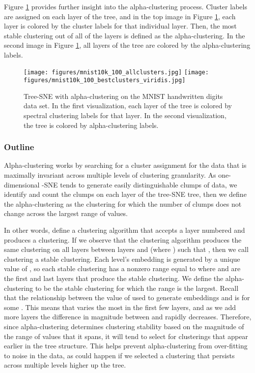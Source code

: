 \documentclass{article}
\begin{document}
Figure \ref{fig:MNIST-alpha-clustering-all-best} provides further insight into the alpha-clustering process. Cluster labels are assigned on each layer of the tree, and in the top image in Figure \ref{fig:MNIST-alpha-clustering-all-best}, each layer is colored by the cluster labels for that individual layer. Then, the most stable clustering out of all of the layers is defined as the alpha-clustering. In the second image in Figure \ref{fig:MNIST-alpha-clustering-all-best}, all layers of the tree are colored by the alpha-clustering labels.  

\begin{figure}[htp]
    \centering
    \captionsetup{width=.9\linewidth}
    \texttt{[image: figures/mnist10k\_100\_allclusters.jpg]}
    \texttt{[image: figures/mnist10k\_100\_bestclusters\_viridis.jpg]}
    \caption{Tree-SNE with alpha-clustering on the MNIST handwritten digits data set. In the first visualization, each layer of the tree is colored by spectral clustering labels for that layer. In the second visualization, the tree is colored by alpha-clustering labels.}
    \label{fig:MNIST-alpha-clustering-all-best}
\end{figure}

\subsubsection{Outline}

Alpha-clustering works by searching for a cluster assignment for the data that is maximally invariant across multiple levels of clustering granularity. As one-dimensional -SNE tends to generate easily distinguishable clumps of data, we identify and count the clumps on each layer of the tree-SNE tree, then we define the alpha-clustering as the clustering for which the number of clumps does not change across the largest range of  values. 

In other words, define a clustering algorithm  that accepts a layer numbered  and produces a clustering. If we observe that the clustering algorithm  produces the same clustering on all layers between layers  and  (where ) such that , then we call clustering  a stable clustering. Each level's embedding is generated by a unique value of , so each stable clustering has a nonzero  range equal to  where  and  are the first and last layers that produce the stable clustering. We define the alpha-clustering to be the stable clustering for which the  range is the largest. Recall that the relationship between the value of  used to generate embeddings  and  is  for some . This means that  varies the most in the first few layers, and as we add more layers the difference in magnitude between  and  rapidly decreases. Therefore, since alpha-clustering determines clustering stability based on the magnitude of the range of  values that it spans, it will tend to select for clusterings that appear earlier in the tree structure. This helps prevent alpha-clustering from over-fitting to noise in the data, as could happen if we selected a clustering that persists across multiple levels higher up the tree.
\end{document}
